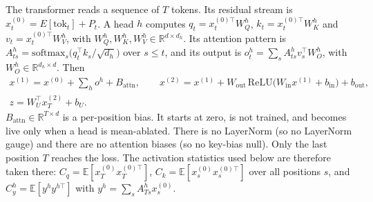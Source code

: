 \documentclass[11pt,a4paper]{article}
\theoremstyle{definition}
\newcommand{\R}{\mathbb{R}}
\newcommand{\E}{\mathbb{E}}
\begin{document}
The transformer reads a sequence of $T$ tokens. Its residual stream is
$x^{(0)}_t=E[\mathrm{tok}_t]+P_t$. A head $h$ computes
$q_t=x^{(0)\top}_tW^h_Q$, $k_t=x^{(0)\top}_tW^h_K$ and $v_t=x^{(0)\top}_tW^h_V$, with
$W^h_{Q},W^h_K,W^h_V\in\R^{d\times d_h}$. Its attention pattern is
$A^h_{ts}=\mathrm{softmax}_s\big(q_t^{\top}k_s/\sqrt{d_h}\big)$ over $s\le t$, and its
output is $o^h_t=\sum_sA^h_{ts}v_s^{\top}W^h_O$, with $W^h_O\in\R^{d_h\times d}$. Then
\begin{gather*}
x^{(1)}=x^{(0)}+\sum_ho^h+B_{\mathrm{attn}},\qquad
x^{(2)}=x^{(1)}+W_{\mathrm{out}}\,\mathrm{ReLU}\big(W_{\mathrm{in}}x^{(1)}+b_{\mathrm{in}}\big)+b_{\mathrm{out}},\\
z=W_U^{\top}x^{(2)}_T+b_U .
\end{gather*}
$B_{\mathrm{attn}}\in\R^{T\times d}$ is a per-position bias. It starts at zero, is not
trained, and becomes live only when a head is mean-ablated. There is no LayerNorm (so
no LayerNorm gauge) and there are no attention biases (so no key-bias null). Only the
last position $T$ reaches the loss. The activation statistics used below are therefore
taken there: $C_q=\E[x^{(0)}_Tx^{(0)\top}_T]$,
$C_k=\E[x^{(0)}_sx^{(0)\top}_s]$ over all positions $s$, and
$C^h_y=\E[y^hy^{h\top}]$ with $y^h=\sum_sA^h_{Ts}x^{(0)}_s$.
\end{document}
